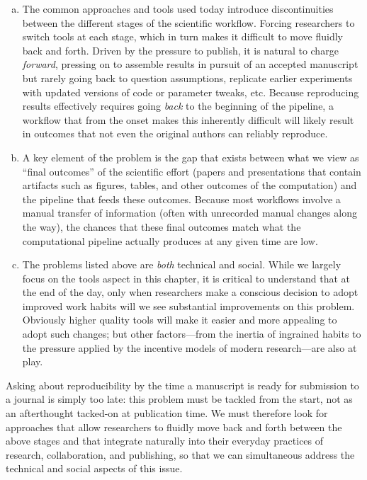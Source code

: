 \documentclass[ChapterTOCs,krantz2]{krantz} %
\begin{document}
\begin{enumerate}[(a)]

\item The common approaches and tools used today introduce discontinuities
  between the different stages of the scientific workflow. Forcing researchers to switch tools
  at each stage, which in turn makes it difficult to move fluidly back and forth.
  Driven by the pressure to publish, it is natural to charge
  \emph{forward}, pressing on to assemble results in pursuit of an accepted
  manuscript but rarely going back to question assumptions, replicate earlier
  experiments with updated versions of code or parameter tweaks, etc.  Because
  reproducing results effectively requires going \emph{back} to the
  beginning of the pipeline, a workflow that from the onset makes this
  inherently difficult will likely result in outcomes that not even the
  original authors can reliably reproduce.

\item A key element of the problem is the gap that exists between what
  we view as ``final outcomes'' of the scientific effort (papers and
  presentations that contain artifacts such as figures, tables, and other
  outcomes of the computation) and the pipeline that feeds these outcomes.
  Because most workflows involve a manual transfer of information (often with
  unrecorded manual changes along the way), the chances that these final
  outcomes match what the computational pipeline actually produces at any
  given time are low.

\item The problems listed above are \emph{both} technical and social.  While we
  largely focus on the tools aspect in this chapter, it is critical to understand
  that at the end of the day, only when researchers make a conscious decision to
  adopt improved work habits will we see substantial improvements on this problem.
  Obviously higher quality tools will make it easier and more appealing to
  adopt such changes; but other factors---from the
  inertia of ingrained habits to the pressure applied by the
  incentive models of modern research---are also at play.
\end{enumerate}
Asking about reproducibility by the time a manuscript is
ready for submission to a journal is simply too late: this problem must be
tackled from the start, not as an afterthought tacked-on at publication time.
We must therefore look for approaches that allow researchers to fluidly move
back and forth between the above stages and that integrate naturally into their
everyday practices of research, collaboration, and publishing, so that we can
simultaneous address the technical and social aspects of this issue.
\end{document}
